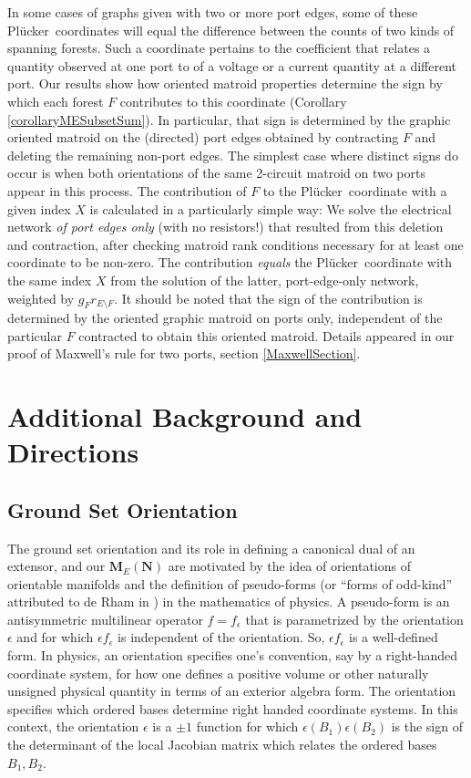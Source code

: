 \documentclass[12pt]{article}
\theoremstyle{definition}
\newcommand{\ext}[1]{\ensuremath{\mathbf{#1}}}
\newcommand{\Plucker}{Pl\"{u}cker\ }
\begin{document}
In some cases of graphs given with two or more port edges, some of these
\Plucker coordinates will equal the difference 
between the counts of two kinds of spanning forests.  Such a coordinate
pertains to the coefficient that relates a quantity observed at 
one port to of a voltage or a current quantity at a different port.  
Our results show how oriented matroid properties determine the sign by which
each forest $F$ contributes to this coordinate 
(Corollary \ref{corollaryMESubsetSum}).
In particular,
that sign is determined by the graphic oriented matroid on the (directed)
port edges obtained by contracting $F$ and deleting the remaining non-port
edges.  
The simplest case where distinct signs do occur is when both orientations
of the same 2-circuit matroid on two ports appear in this process.
The contribution of $F$ to the \Plucker coordinate with 
a given index $X$ is 
calculated in a particularly simple way:  We solve the electrical network 
\textit{of port edges only} (with no resistors!)
that resulted from this deletion and contraction,
after checking matroid rank conditions necessary for at least
one coordinate to be non-zero.
The contribution \emph{equals} the \Plucker coordinate with the same index 
$X$ from
the solution of the latter, port-edge-only network, weighted by
$g_Fr_{E\setminus F}$.
It should be noted that the sign of the contribution
is determined by the oriented graphic matroid on ports only, independent
of the particular $F$ contracted to obtain this oriented matroid.
Details appeared in our proof of Maxwell's rule for two ports, section 
\ref{MaxwellSection}.





\section{Additional Background and Directions}
\subsection{Ground Set Orientation}
\label{GroundSetOrientationBack}

The ground set orientation
and its role in defining a
canonical dual of an extensor, and our $\ext{M}_E(\ext{N})$ are motivated by
the idea of orientations of orientable manifolds and the definition
of pseudo-forms (or ``forms of odd-kind'' attributed to de Rham in
\cite{Frankel}) in the mathematics of physics.  A pseudo-form
is an antisymmetric multilinear operator $f=f_\epsilon$
that is parametrized by the orientation $\epsilon$ and for which
$\epsilon f_\epsilon$ is independent of the orientation\cite{Frankel}.
So, $\epsilon f_\epsilon$ is a well-defined 
form.  In physics, an orientation
specifies one's convention, say by a right-handed coordinate system, 
for how one defines
a positive volume or other naturally unsigned physical quantity
in terms of an exterior algebra form.  The orientation specifies
which ordered bases determine right handed coordinate systems.
In this context, the orientation $\epsilon$ is a $\pm 1$ function 
for which 
$\epsilon(B_1)\epsilon(B_2)$
is the sign of the determinant of the local Jacobian 
matrix which relates the ordered bases $B_1,B_2$.  
\end{document}
